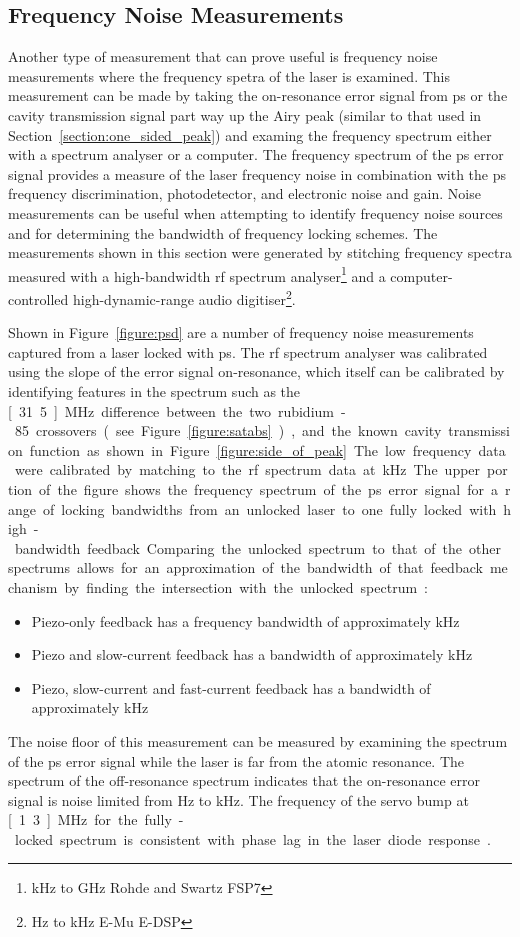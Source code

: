 \subsection{Frequency Noise Measurements}

Another type of measurement that can prove useful is frequency noise measurements where the frequency spetra of the laser is examined.
This measurement can be made by taking the on-resonance error signal from \gls{ps} or the cavity transmission signal part way up the Airy peak (similar to that used in Section~\ref{section:one_sided_peak}) and examing the frequency spectrum either with a spectrum analyser or a computer.
The frequency spectrum of the \gls{ps} error signal provides a measure of the laser frequency noise in combination with the \gls{ps} frequency discrimination, photodetector, and electronic noise and gain.
Noise measurements can be useful when attempting to identify frequency noise sources and for determining the bandwidth of frequency locking schemes.
The measurements shown in this section were generated by stitching frequency spectra measured with a high-bandwidth \gls{rf} spectrum analyser\footnote{\unit[9]{kHz} to \unit[7]{GHz} Rohde and Swartz FSP7} and a computer-controlled high-dynamic-range audio digitiser\footnote{\unit[24]{Hz} to \unit[100]{kHz} E-Mu E-DSP}.

Shown in Figure~\ref{figure:psd} are a number of frequency noise measurements captured from a laser locked with \gls{ps}.
The \gls{rf} spectrum analyser was calibrated using the slope of the error signal on-resonance, which itself can be calibrated by identifying features in the spectrum such as the \unit[31.5]{MHz} difference between the two rubidium-85 crossovers (see Figure~\ref{figure:satabs}), and the known cavity transmission function as shown in Figure~\ref{figure:side_of_peak}.
The low frequency data were calibrated by matching to the \gls{rf} spectrum data at \unit[10]{kHz}.
The upper portion of the figure shows the frequency spectrum of the \gls{ps} error signal for a range of locking bandwidths from an unlocked laser to one fully locked with high-bandwidth feedback.
Comparing the unlocked spectrum to that of the other spectrums allows for an approximation of the bandwidth of that feedback mechanism by finding the intersection with the unlocked spectrum:
\begin{itemize}
    \item Piezo-only feedback has a frequency bandwidth of approximately \unit[1]{kHz}
    \item Piezo and slow-current feedback has a bandwidth of approximately \unit[50]{kHz}
    \item Piezo, slow-current and fast-current feedback has a bandwidth of approximately \unit[500]{kHz}
\end{itemize}
The noise floor of this measurement can be measured by examining the spectrum of the \gls{ps} error signal while the laser is far from the atomic resonance.
The spectrum of the off-resonance spectrum indicates that the on-resonance error signal is noise limited from \unit[450]{Hz} to \unit[350]{kHz}.
The frequency of the servo bump at \unit[1.3]{MHz} for the fully-locked spectrum is consistent with phase lag in the laser diode response~\cite{wieman_using_1991}.

